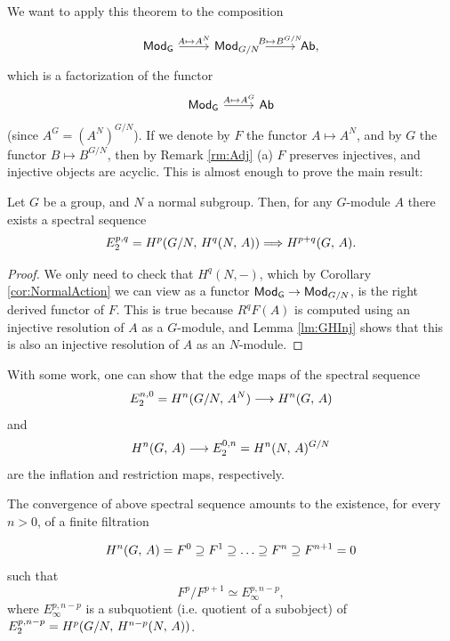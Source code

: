 \documentclass[a4paper, oneside]{memoir}
\begin{document}
\noindent We want to apply this theorem to the composition

\[
    \begin{tikzcd}
        \Gmod \arrow[r, "A\mapsto A^N"] & \mathsf{Mod}_{G/N} \arrow[r, "B\mapsto B^{G/N}"] & \Ab,
    \end{tikzcd}
\]
which is a factorization of the functor
\[
    \begin{tikzcd}
        \Gmod \arrow[r, "A\mapsto A^G"] & \Ab
    \end{tikzcd}
\]
(since $A^G = (A^N)^{G/N}$). If we denote by $F$ the functor $A\mapsto A^N$, and by $G$ the functor $B\mapsto B^{G/N}$, then by Remark \ref{rm:Adj} (a) $F$ preserves injectives, and injective objects are acyclic. This is almost enough to prove the main result:

\begin{theorem}\label{thm:HS}
    Let $G$ be a group, and $N$ a normal subgroup. Then, for any $G$-module $A$ there exists a spectral sequence
    \[
        E_2^{p,q} = H^{p}( G/N, \, H^{q}( N, \, A ) ) \Longrightarrow H^{p+q}( G, \, A )
        .\]
\end{theorem}

\begin{proof}
    We only need to check that $H^q(N,-)$, which by Corollary \ref{cor:NormalAction} we can view as a functor $\mathsf{Mod}_\mathsf{G} \to \mathsf{Mod}_{G/N}$, is the right derived functor of $F$. This is true because $R^qF(A)$ is computed using an injective resolution of $A$ as a $G$-module, and Lemma \ref{lm:GHInj} shows that this is also an injective resolution of $A$ as an $N$-module.
\end{proof}

\begin{remark}
    With some work, one can show that the edge maps of the spectral sequence
    \[
        E_2^{n,0}=H^{n}( G /N, \, A^N ) \longrightarrow H^{n}( G, \, A )
    \]
    and
    \[
        H^{n}( G, \, A ) \longrightarrow E_2^{0,n} = H^{n}( N, \, A )^{G/N}
    \]
    are the inflation and restriction maps, respectively.
\end{remark}

The convergence of above spectral sequence amounts to the existence, for every $n>0$, of a finite filtration

\[
    H^{n}( G, \, A )=F^0\supseteq F^1\supseteq\ldots\supseteq F^n\supseteq F^{n+1}=0
\]
such that
\begin{equation}\label{eq:Convergence}
    F^p/F^{p+1} \simeq E_\infty^{p,n-p},
\end{equation}
where $E_\infty^{p,n-p}$ is a subquotient (i.e. quotient of a subobject) of $E_2^{p,n-p}= H^{p}( G/N, \, H^{n-p}( N, \, A ) )$.
\end{document}

